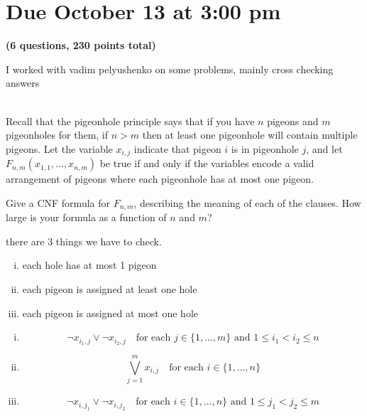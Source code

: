 \documentclass[11pt]{article}
\begin{document}
\maketitle

\section*{Due October 13 at 3:00 pm}

\textbf{(6 questions, 230 points total)}

I worked with vadim pelyushenko on some problems, mainly cross checking answers

\begin{qunlist}

  \\
  Recall that the pigeonhole principle says that if you have $n$ pigeons and $m$ pigeonholes for them, if $n > m$ then at least one pigeonhole will contain multiple pigeons.
  Let the variable $x_{i,j}$ indicate that pigeon $i$ is in pigeonhole $j$, and let $F_{n,m}(x_{1,1}, \dots, x_{n,m})$ be true if and only if the variables encode a valid arrangement of pigeons where each pigeonhole has at most one pigeon.
  \begin{qparts}
  \item
    Give a CNF formula for $F_{n,m}$, describing the meaning of each of the clauses.
    How large is your formula as a function of $n$ and $m$?

    \begin{answer}
      there are 3 things we have to check.
      \begin{enumerate}[i.]
        \item each hole has at most 1 pigeon
        \item each pigeon is assigned at least one hole
        \item each pigeon is assigned at most one hole
      \end{enumerate}

      \begin{enumerate}[i.]
        \item
          \begin{equation}
            \neg x_{i_1, j} \lor \neg x_{i_2, j} \quad \text{for each } j \in \{1, \dots, m\} \text{ and } 1 \le i_1 < i_2 \le n
          \end{equation}
        \item
          \begin{equation}
            \bigvee_{j=1}^{m} x_{i,j} \quad \text{for each } i \in \{1, \dots, n\}
          \end{equation}
        \item
          \begin{equation}
            \neg x_{i, j_1} \lor \neg x_{i, j_2} \quad \text{for each } i \in \{1, \dots, n\} \text{ and } 1 \le j_1 < j_2 \le m
          \end{equation}
      \end{enumerate}


\end{answer}
\end{qparts}
\end{qunlist}
\end{document}
